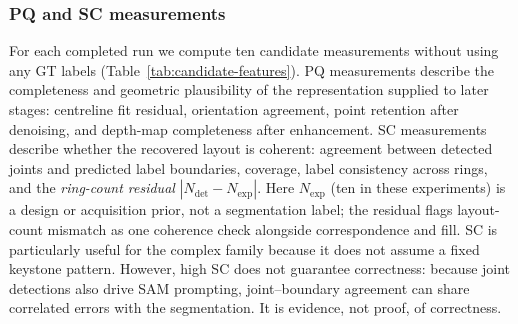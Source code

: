 \documentclass[a4paper,fleqn]{cas-dc}
\begin{document}
\subsubsection{PQ and SC measurements}
\label{sec:features}

For each completed run we compute ten candidate measurements without using any GT labels (Table~\ref{tab:candidate-features}). PQ measurements describe the completeness and geometric plausibility of the representation supplied to later stages: centreline fit residual, orientation agreement, point retention after denoising, and depth-map completeness after enhancement. SC measurements describe whether the recovered layout is coherent: agreement between detected joints and predicted label boundaries, coverage, label consistency across rings, and the \emph{ring-count residual} $|N_{\mathrm{det}}-N_{\mathrm{exp}}|$. Here $N_{\mathrm{exp}}$ (ten in these experiments) is a design or acquisition prior, not a segmentation label; the residual flags layout-count mismatch as one coherence check alongside correspondence and fill. SC is particularly useful for the complex family because it does not assume a fixed keystone pattern. However, high SC does not guarantee correctness: because joint detections also drive SAM prompting, joint--boundary agreement can share correlated errors with the segmentation. It is evidence, not proof, of correctness.
\end{document}
